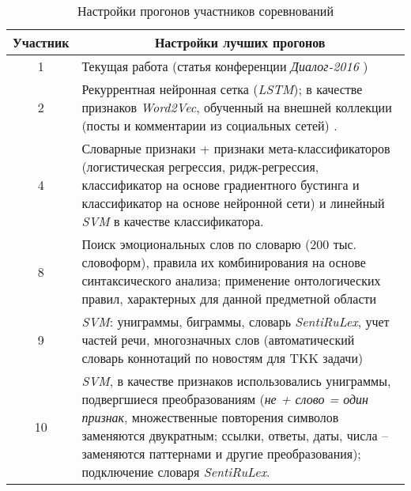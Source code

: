 \begin{table}[htp!]
\centering
\caption{Настройки прогонов участников соревнований}
\label{table:participants}
\begin{tabular}{cp{13.2cm}}
\hline
Участник        & \multicolumn{1}{|c}{Настройки лучших прогонов}                                                                                                                                                                                                                     \\ \hline
1               & Текущая работа (статья конференции {\it Диалог-2016} \cite{myArticle})                                                                                                                                                                                                        \\
2               & Рекуррентная нейронная сетка ({\it LSTM}); в качестве признаков {\it Word2Vec}, обученный на внешней коллекции (посты и комментарии из социальных сетей) \cite{neuralNetworks}.                                                                                                                                            \\
4               & Словарные признаки + признаки мета-классификаторов (логистическая регрессия, ридж-регрессия, классификатор на основе градиентного бустинга и классификатор на основе нейронной сети) и линейный {\it SVM} в качестве классификатора.                                                                 \\
8               & Поиск эмоциональных слов по словарю (200 тыс. словоформ), правила их комбинирования на основе синтаксического анализа; применение онтологических правил, характерных для данной предметной области                                                                                                  \\
9               & {\it SVM}: униграммы, биграммы, словарь {\it SentiRuLex}, учет частей речи, многозначных слов (автоматический словарь коннотаций по новостям для TKK задачи)                                                                                                                                         \\
10              & {\it SVM}, в качестве признаков использовались униграммы, подвергшиеся преобразованиям ({\it не + слово = один признак}, множественные повторения символов заменяются двукратным; ссылки, ответы, даты, числа – заменяются паттернами и другие преобразования); подключение словаря {\it SentiRuLex}.\\ \hline
\end{tabular}
\end{table}

